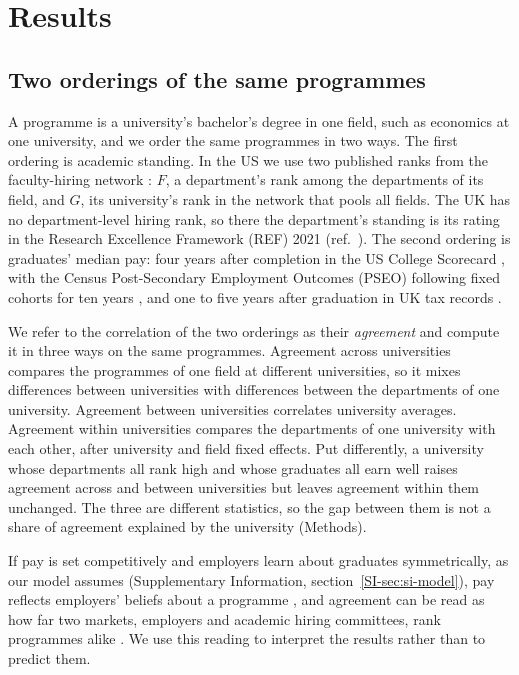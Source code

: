 \documentclass[11pt]{article}
\newcommand{\SIsec}[1]{Supplementary Information, section~\ref{SI-#1}}
\begin{document}
\section*{Results}

\subsection*{Two orderings of the same programmes}

A programme is a university's bachelor's degree in one field, such as economics at one university, and we order the
same programmes in two ways. The first ordering is academic standing. In the US we use two published ranks from the
faculty-hiring network \citep{wapman2022quantifying}: $F$, a department's rank among the departments of its field,
and $G$, its university's rank in the network that pools all fields. The UK has no department-level hiring rank, so
there the department's standing is its rating in the Research Excellence Framework (REF) 2021
(ref.~). The second ordering is graduates' median pay: four years after completion in the US College
Scorecard \citep{scorecard}, with the Census Post-Secondary Employment Outcomes (PSEO) following fixed cohorts for ten
years \citep{pseo2026}, and one to five years after graduation in UK tax records \citep{dfe_leo_provider}.

We refer to the correlation of the two orderings as their \emph{agreement} and compute it in three ways on the same
programmes. Agreement across universities compares the programmes of one field at different universities, so it
mixes differences between universities with differences between the departments of one university. Agreement
between universities correlates university averages. Agreement within universities compares the departments of one
university with each other, after university and field fixed effects. Put differently, a university whose departments
all rank high and whose graduates all earn well raises agreement across and between universities but leaves
agreement within them unchanged. The three are different statistics, so the gap between them is not a share of
agreement explained by the university (Methods).

If pay is set competitively and employers learn about graduates symmetrically, as our model assumes
(\SIsec{sec:si-model}), pay reflects employers' beliefs about a programme
\citep{farber1996learning, altonji2001employer, macleod2017big}, and agreement can be read as how far two markets,
employers and academic hiring committees, rank programmes alike \citep{macleod2015reputation}. We use this reading to
interpret the results rather than to predict them.
\end{document}
